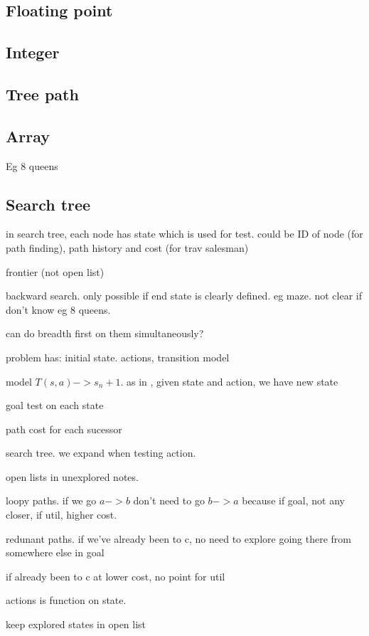 
\subsection{Floating point}

\subsection{Integer}

\subsection{Tree path}

\subsection{Array}

Eg 8 queens


\subsection{Search tree}
in search tree, each node has state which is used for test. could be ID of node (for path finding), path history and cost (for trav salesman)

frontier (not open list)

backward search. only possible if end state is clearly defined. eg maze. not clear if don't know eg 8 queens.

can do breadth first on them simultaneously?

problem has: initial state. actions, transition model

model \(T(s, a)-> s_n+1\). as in , given state and action, we have new state

goal test on each state

path cost for each sucessor

search tree. we expand when testing action.

open lists in unexplored notes.

loopy paths. if we go \(a->b\) don't need to go \(b->a\) because if goal, not any closer, if util, higher cost.

redunant paths. if we've already been to c, no need to explore going there from somewhere else in goal

if already been to c at lower cost, no point for util

actions is function on state.

keep explored states in open list

